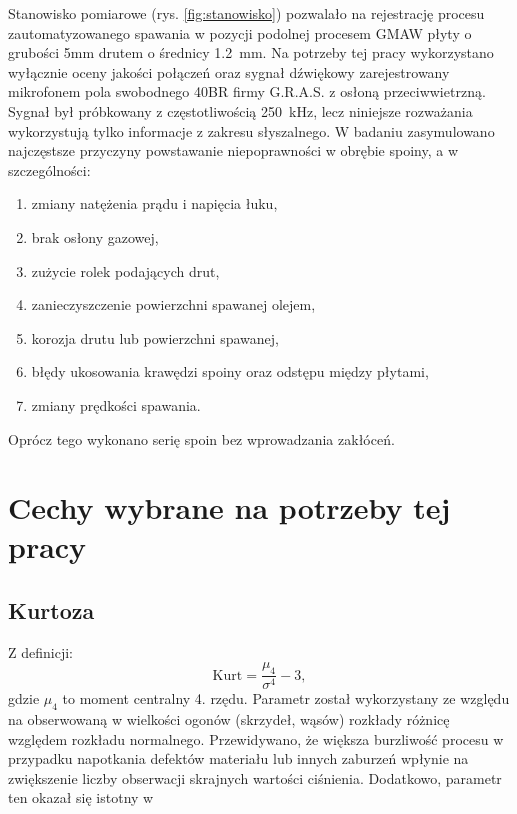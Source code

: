 \documentclass{mwart}
\begin{document}
Stanowisko pomiarowe (rys. \ref{fig:stanowisko})
pozwalało na rejestrację procesu zautomatyzowanego spawania w pozycji podolnej procesem GMAW płyty o grubości 5mm drutem o średnicy 1.2~mm. Na potrzeby tej pracy wykorzystano wyłącznie oceny jakości połączeń oraz sygnał dźwiękowy zarejestrowany mikrofonem pola swobodnego 40BR firmy G.R.A.S. z osłoną przeciwwietrzną. Sygnał był próbkowany z częstotliwością 250~kHz, lecz niniejsze rozważania wykorzystują tylko informacje z zakresu słyszalnego. W badaniu zasymulowano najczęstsze przyczyny powstawanie niepoprawności w obrębie spoiny, a w szczególności:
\begin{enumerate}
    \item zmiany natężenia prądu i napięcia łuku,
    \item brak osłony gazowej,
    \item zużycie rolek podających drut,
    \item zanieczyszczenie powierzchni spawanej olejem,
    \item korozja drutu lub powierzchni spawanej,
    \item błędy ukosowania krawędzi spoiny oraz odstępu między płytami,
    \item zmiany prędkości spawania.
\end{enumerate}
Oprócz tego wykonano serię spoin bez wprowadzania zakłóceń.



\section{Cechy wybrane na potrzeby tej pracy}
\subsection{Kurtoza}
Z definicji:
\begin{equation}
    \mathrm{Kurt}= \frac{\mu_4}{\sigma^4}-3,
\end{equation}
gdzie $\mu_4$ to moment centralny 4. rzędu.
Parametr został wykorzystany ze względu na obserwowaną w wielkości ogonów (skrzydeł, wąsów) rozkłady różnicę względem rozkładu normalnego. Przewidywano, że większa burzliwość procesu w przypadku napotkania defektów materiału lub innych zaburzeń wpłynie na zwiększenie liczby obserwacji skrajnych wartości ciśnienia. Dodatkowo, parametr ten okazał się istotny w \cite{fidali_detection_2018}
\end{document}
